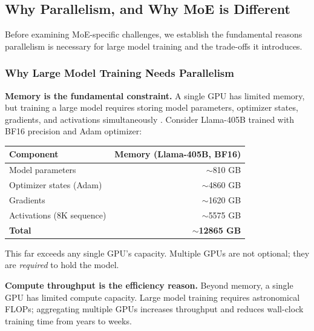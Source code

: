 \documentclass[10pt,logo,copyright]{nvidiatechreport}
\begin{document}
\subsection{Why Parallelism, and Why MoE is Different}\label{sec:why-parallelism}

Before examining MoE-specific challenges, we establish the fundamental reasons parallelism is necessary for large model training and the trade-offs it introduces.

\subsubsection{Why Large Model Training Needs Parallelism}

\textbf{Memory is the fundamental constraint.} A single GPU has limited memory, but training a large model requires storing model parameters, optimizer states, gradients, and activations simultaneously \cite{rasley2020deepspeed}. Consider Llama-405B \cite{grattafiori2024llama3herdmodels,touvron2023llama,touvron2023llama2} trained with BF16 precision and Adam optimizer:

\begin{center}
\begin{tabular}{lr}
\toprule
\textbf{Component} & \textbf{Memory (Llama-405B, BF16)} \\
\midrule
Model parameters & $\sim$810 GB \\
Optimizer states (Adam) & $\sim$4860 GB \\
Gradients & $\sim$1620 GB \\
Activations (8K sequence) & $\sim$5575 GB \\
\midrule
\textbf{Total} & \textbf{$\sim$12865 GB} \\
\bottomrule
\end{tabular}
\end{center}

This far exceeds any single GPU's capacity. Multiple GPUs are not optional; they are \emph{required} to hold the model.

\textbf{Compute throughput is the efficiency reason.} Beyond memory, a single GPU has limited compute capacity. Large model training requires astronomical FLOPs; aggregating multiple GPUs increases throughput and reduces wall-clock training time from years to weeks.
\end{document}
